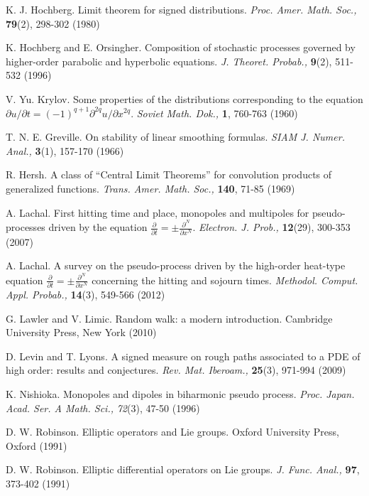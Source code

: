 \documentclass{article}
\theoremstyle{theorem}
\theoremstyle{remark}
\begin{document}
\begin{thebibliography}{99}
 K. J. Hochberg. Limit theorem for signed distributions. \textit{Proc. Amer.  Math. Soc.,} \textbf{79}(2), 298-302 (1980)

 K. Hochberg and E. Orsingher. Composition of stochastic processes governed by higher-order parabolic and hyperbolic equations. \textit{J. Theoret. Probab.,} \textbf{9}(2), 511-532 (1996)

 V. Yu. Krylov. Some properties of the distributions corresponding to the equation $\partial u/\partial t=(-1)^{q+1}\partial^{2q}u/\partial x^{2q}$. \textit{Soviet Math. Dok.,} \textbf{1}, 760-763 (1960)  

 T. N. E. Greville. On stability of linear smoothing formulas. \textit{SIAM J. Numer. Anal.,} \textbf{3}(1), 157-170  (1966)

 R. Hersh. A class of ``Central Limit Theorems'' for convolution
products of generalized functions. \textit{Trans. Amer. Math. Soc.,} \textbf{140}, 71-85 (1969)

 A. Lachal. First hitting time and place, monopoles and multipoles for pseudo-processes driven by the equation $\frac{\partial}{\partial t}=\pm \frac{\partial^N}{\partial x^N}$. \textit{Electron. J. Prob.,} \textbf{12}(29), 300-353 (2007)

 A. Lachal. A survey on the pseudo-process driven by the high-order heat-type equation $\frac{\partial}{\partial t}=\pm \frac{\partial^N}{\partial x^N}$ concerning the hitting and sojourn times. \textit{Methodol. Comput. Appl. Probab.,} \textbf{14}(3), 549-566 (2012)

 G. Lawler and V. Limic. Random walk: a modern introduction. Cambridge University Press, New York (2010) 

 D. Levin and T. Lyons. A signed measure on rough paths associated to a PDE of high order: results and conjectures.  \textit{Rev. Mat. Iberoam.,} \textbf{25}(3), 971-994 (2009) 

 K. Nishioka. Monopoles and dipoles in biharmonic pseudo process. \textit{Proc. Japan. Acad. Ser. A Math. Sci.,} \textit{72}(3), 47-50 (1996)

 D. W. Robinson. Elliptic operators and Lie groups. Oxford University Press, Oxford (1991)

 D. W. Robinson. Elliptic differential operators on Lie groups. \textit{J. Func. Anal.,} \textbf{97}, 373-402 (1991)


\end{thebibliography}
\end{document}
